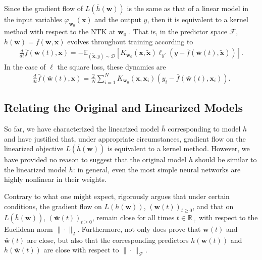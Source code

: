 \documentclass{article}
\begin{document}
Since the gradient flow of $L(\bar{h}(\boldsymbol{w}))$ is the same as that of a linear model in the input variables $\varphi_{\boldsymbol{w}_0}(\boldsymbol{x})$ and the output $y$, then it is equivalent to a kernel method with respect to the NTK at $\boldsymbol{w}_0$ \cite{chizat2018note} \cite{jacot2018neural}. That is, in the predictor space $\mathcal{F}$, $h(\boldsymbol{w}) = \bar{f}(\boldsymbol{w}, \boldsymbol{x})$ evolves throughout training according to
\begin{align*}
    \frac{d}{dt} \bar{f}(\boldsymbol{\bar{w}}(t), \boldsymbol{x}) = -\mathbb{E}_{(\boldsymbol{\tilde{x}}, y) \sim \mathcal{D}} \left[K_{\boldsymbol{w}_0}(\boldsymbol{x}, \boldsymbol{\tilde{x}}) \ell_{y'}(y - \bar{f}(\boldsymbol{\bar{w}}(t), \boldsymbol{\tilde{x}})) \right].
\end{align*}
In the case of $\ell$ the square loss, these dynamics are
\begin{align*}
    \frac{d}{dt} \bar{f}(\boldsymbol{\bar{w}}(t), \boldsymbol{x}) = \frac{2}{N} \sum_{i=1}^N K_{\boldsymbol{w}_0}(\boldsymbol{x}, \boldsymbol{x}_i)(y_i - \bar{f}(\boldsymbol{\bar{w}}(t), \boldsymbol{x}_i)).
\end{align*}

\subsection{Relating the Original and Linearized Models}\label{kerneltheory}

So far, we have characterized the linearized model $\bar{h}$ corresponding to model $h$ and have justified that, under appropriate circumstances, gradient flow on the linearized objective $L(\bar{h}(\boldsymbol{w}))$ is equivalent to a kernel method. However, we have provided no reason to suggest that the original model $h$ should be similar to the linearized model $\bar{h}$: in general, even the most simple neural networks are highly nonlinear in their weights. 

Contrary to what one might expect, \cite{chizat2019lazy} rigorously argues that under certain conditions, the gradient flow on $L(h(\boldsymbol{w}))$, $(\boldsymbol{w}(t))_{t \geq 0}$, and that on $L(\bar{h}(\boldsymbol{w}))$, $(\boldsymbol{\bar{w}}(t))_{t \geq 0}$, remain close for all times $t \in \mathbb{R}_+$ with respect to the Euclidean norm $\| \cdot \|_2$. Furthermore, not only does \cite{chizat2019lazy} prove that $\boldsymbol{w}(t)$ and $\boldsymbol{\bar{w}}(t)$ are close, but also that the corresponding predictors $h(\boldsymbol{w}(t))$ and $h(\boldsymbol{\bar{w}}(t))$ are close with respect to $\| \cdot \|_{\mathcal{F}}$.
\end{document}
